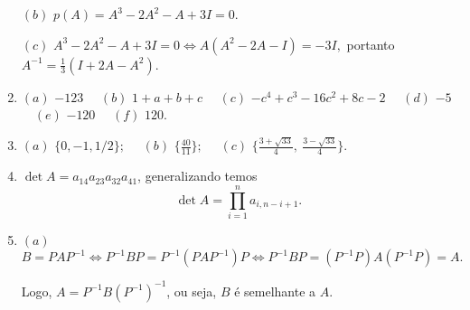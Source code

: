 \documentclass{report}
\begin{document}
\begin{enumerate}
$(b)$  $p(A)= A^3 -2A^2 -A +3I = 0$.

$(c)$  $A^3 -2A^2 -A +3I = 0 \Leftrightarrow A(A^2 -2A - I) =
-3I,$ portanto $A^{-1} = \frac{1}{3} (I+2A -A^2)$.


\item $(a)$ $-123$ \ \  $(b)$ $1 + a + b +c$ \ \ $(c)$ $-c^4 +c^3
-16 c^2 +8c -2$ \ \ $(d)$  $-5$ \  \  $(e)$ $-120$  \ \ $(f)$
$120.$



\item $(a)$ $ \{ 0, -1, 1/2\};$ \ \  $(b)$ $ \{\frac{40}{11}\};$ \
\  $(c)$ $ \{\frac{3 +\sqrt{33}}{4}, \ \frac{3 -\sqrt{33}}{4}\}.$






\item $\det A = a_{14} a_{23} a_{32} a_{41}$, generalizando temos
$$\det A = \prod_{i=1}^{n}a_{i, n-i+1}.$$



\item $(a)$ $B= PAP^{-1} \Leftrightarrow P^{-1}BP=
P^{-1}(PAP^{-1})P\Leftrightarrow P^{-1}BP= (P^{-1}P)A(P^{-1}P)=A.$

Logo, $A = P^{-1}B(P^{-1})^{-1}$, ou seja, $B$ é semelhante a $A$.


\end{enumerate}
\end{document}

